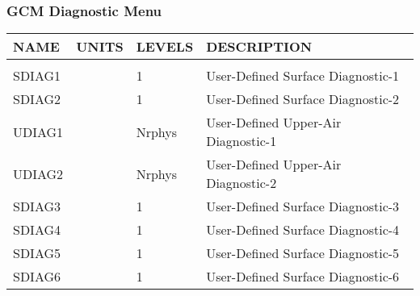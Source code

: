 \subsubsection{GCM Diagnostic Menu}
\label{sec:diagnostics:menu}

\begin{tabular}{llll}
\hline\hline
 NAME & UNITS & LEVELS & DESCRIPTION \\
\hline

&\\
 SDIAG1   &             &    1  
         &\begin{minipage}[t]{3in}
          {User-Defined Surface Diagnostic-1} 
         \end{minipage}\\
 SDIAG2   &             &    1  
         &\begin{minipage}[t]{3in}
          {User-Defined Surface Diagnostic-2} 
         \end{minipage}\\
 UDIAG1   &             &    Nrphys
         &\begin{minipage}[t]{3in}
          {User-Defined Upper-Air Diagnostic-1} 
         \end{minipage}\\
 UDIAG2   &             &    Nrphys
         &\begin{minipage}[t]{3in}
          {User-Defined Upper-Air Diagnostic-2} 
         \end{minipage}\\
 SDIAG3   &             &    1  
         &\begin{minipage}[t]{3in}
          {User-Defined Surface Diagnostic-3} 
         \end{minipage}\\
 SDIAG4   &             &    1  
         &\begin{minipage}[t]{3in}
          {User-Defined Surface Diagnostic-4} 
         \end{minipage}\\
 SDIAG5   &             &    1  
         &\begin{minipage}[t]{3in}
          {User-Defined Surface Diagnostic-5} 
         \end{minipage}\\
 SDIAG6   &             &    1  
         &\begin{minipage}[t]{3in}
          {User-Defined Surface Diagnostic-6} 
         \end{minipage}\\

\end{tabular}
